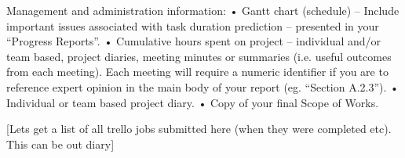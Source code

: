\color{red}
Management and administration information:
•	Gantt chart (schedule) – Include important issues associated with task duration prediction – presented in your “Progress Reports”.
•	Cumulative hours spent on project – individual and/or team based, project diaries, meeting minutes or summaries (i.e. useful outcomes from each meeting).  Each meeting will require a numeric identifier if you are to reference expert opinion in the main body of your report (eg. “Section A.2.3”).
•	Individual or team based project diary.
•	Copy of your final Scope of Works.


[Lets get a list of all trello jobs submitted here (when they were completed etc). This can be out diary]
\color{black}